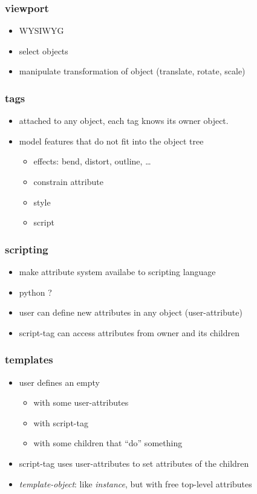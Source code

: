 \documentclass{beamer}
\begin{document}
\begin{frame}[t]\frametitle{viewport}
\begin{itemize}
  \item WYSIWYG
  \item select objects
  \item manipulate transformation of object (translate, rotate, scale)
\end{itemize}
\end{frame}

\begin{frame}[t]\frametitle{tags}
\begin{itemize}
  \item attached to any object, each tag knows its owner object.
  \item model features that do not fit into the object tree
  \begin{itemize}
    \item effects: bend, distort, outline, \dots
    \item constrain attribute
    \item style
    \item script
  \end{itemize}
\end{itemize}
\end{frame}

\begin{frame}[t]\frametitle{scripting}
\begin{itemize}
  \item make attribute system availabe to scripting language
  \item python ?
  \item user can define new attributes in any object (user-attribute)
  \item script-tag can access attributes from owner and its children
\end{itemize}
\end{frame}

\begin{frame}[t]\frametitle{templates}
\begin{itemize}
  \item user defines an empty
  \begin{itemize}
    \item with some user-attributes
    \item with script-tag
    \item with some children that ``do'' something
  \end{itemize}
  \item script-tag uses user-attributes to set attributes of the children
  \item \emph{template-object}: like \emph{instance}, but with free top-level attributes
\end{itemize}
\end{frame}
\end{document}
